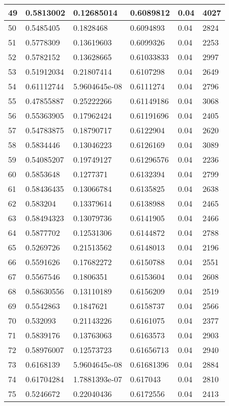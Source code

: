 \begin{longtable}{|l|l|l|l|l|l|}
49 & 0.5813002 & 0.12685014 & 0.6089812 & 0.04 & 4027 \\ \hline 
50 & 0.5485405 & 0.1828468 & 0.6094893 & 0.04 & 2824 \\ \hline 
51 & 0.5778309 & 0.13619603 & 0.6099326 & 0.04 & 2253 \\ \hline 
52 & 0.5782152 & 0.13628665 & 0.61033833 & 0.04 & 2997 \\ \hline 
53 & 0.51912034 & 0.21807414 & 0.6107298 & 0.04 & 2649 \\ \hline 
54 & 0.61112744 & 5.9604645e-08 & 0.6111274 & 0.04 & 2796 \\ \hline 
55 & 0.47855887 & 0.25222266 & 0.61149186 & 0.04 & 3068 \\ \hline 
56 & 0.55363905 & 0.17962424 & 0.61191696 & 0.04 & 2405 \\ \hline 
57 & 0.54783875 & 0.18790717 & 0.6122904 & 0.04 & 2620 \\ \hline 
58 & 0.5834446 & 0.13046223 & 0.6126169 & 0.04 & 3089 \\ \hline 
59 & 0.54085207 & 0.19749127 & 0.61296576 & 0.04 & 2236 \\ \hline 
60 & 0.5853648 & 0.1277371 & 0.6132394 & 0.04 & 2799 \\ \hline 
61 & 0.58436435 & 0.13066784 & 0.6135825 & 0.04 & 2638 \\ \hline 
62 & 0.583204 & 0.13379614 & 0.6138988 & 0.04 & 2465 \\ \hline 
63 & 0.58494323 & 0.13079736 & 0.6141905 & 0.04 & 2466 \\ \hline 
64 & 0.5877702 & 0.12531306 & 0.6144872 & 0.04 & 2788 \\ \hline 
65 & 0.5269726 & 0.21513562 & 0.6148013 & 0.04 & 2196 \\ \hline 
66 & 0.5591626 & 0.17682272 & 0.6150788 & 0.04 & 2551 \\ \hline 
67 & 0.5567546 & 0.1806351 & 0.6153604 & 0.04 & 2608 \\ \hline 
68 & 0.58630556 & 0.13110189 & 0.6156209 & 0.04 & 2519 \\ \hline 
69 & 0.5542863 & 0.1847621 & 0.6158737 & 0.04 & 2566 \\ \hline 
70 & 0.532093 & 0.21143226 & 0.6161075 & 0.04 & 2377 \\ \hline 
71 & 0.5839176 & 0.13763063 & 0.6163573 & 0.04 & 2903 \\ \hline 
72 & 0.58976007 & 0.12573723 & 0.61656713 & 0.04 & 2940 \\ \hline 
73 & 0.6168139 & 5.9604645e-08 & 0.61681396 & 0.04 & 2884 \\ \hline 
74 & 0.61704284 & 1.7881393e-07 & 0.617043 & 0.04 & 2810 \\ \hline 
75 & 0.5246672 & 0.22040436 & 0.6172556 & 0.04 & 2413 \\ \hline 
\end{longtable}